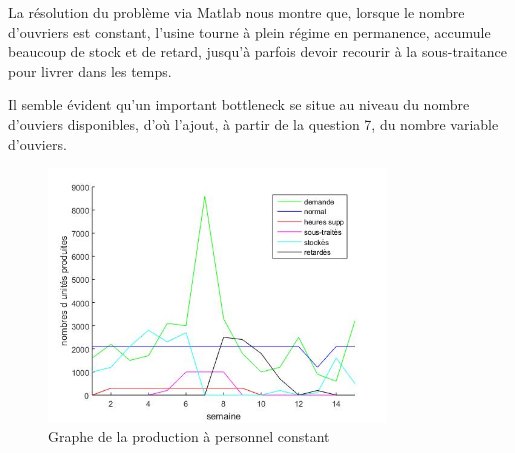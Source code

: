 La résolution du problème via Matlab nous montre que, lorsque le nombre d'ouvriers est constant, l'usine tourne à plein régime en permanence, accumule beaucoup de stock et de retard, jusqu'à parfois devoir recourir à la sous-traitance pour livrer dans les temps.

Il semble évident qu'un important bottleneck se situe au niveau du nombre d'ouviers disponibles, d'où l'ajout, à partir de la question 7, du nombre variable d'ouviers.

\begin{figure}[h]
    \centering
    \includegraphics[width=0.8\textwidth]{graphes/graphq3.jpg}
    \caption{Graphe de la production à personnel constant}
    \label{fig:q3}
\end{figure}
